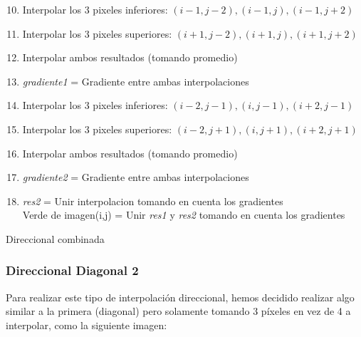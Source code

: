 \documentclass[10pt, a4paper]{article}
\begin{document}
\begin{algorithm}[H]
\begin{enumerate}[label=\bfseries Step \arabic*:]
\setcounter{enumi}{9}
\item Interpolar los 3 pixeles inferiores: $(i-1,j-2),(i-1,j),(i-1,j+2)$\\
\item Interpolar los 3 pixeles superiores: $(i+1,j-2),(i+1,j),(i+1,j+2)$\\
\item Interpolar ambos resultados (tomando promedio)\\
\item \textit{gradiente1} = Gradiente entre ambas interpolaciones\\
\item Interpolar los 3 pixeles inferiores: $(i-2, j-1),(i, j-1), (i+2, j-1)$
\item Interpolar los 3 pixeles superiores: $(i-2, j+1),(i, j+1), (i+2, j+1)$
\item Interpolar ambos resultados (tomando promedio)\\
\item \textit{gradiente2} = Gradiente entre ambas interpolaciones\\
\item \textit{res2} = Unir interpolacion tomando en cuenta los gradientes\\
Verde de imagen(i,j) = Unir \textit{res1} y \textit{res2} tomando en cuenta los gradientes \\
\end{enumerate}
\caption{Direccional combinada}
\end{algorithm}
\vspace{0.5cm}

\subsubsection{Direccional Diagonal 2}

Para realizar este tipo de interpolaci\'on direccional, hemos decidido realizar algo similar a la primera (diagonal) pero solamente tomando 3 p\'ixeles en vez de 4 a interpolar, como la siguiente imagen:
\end{document}

